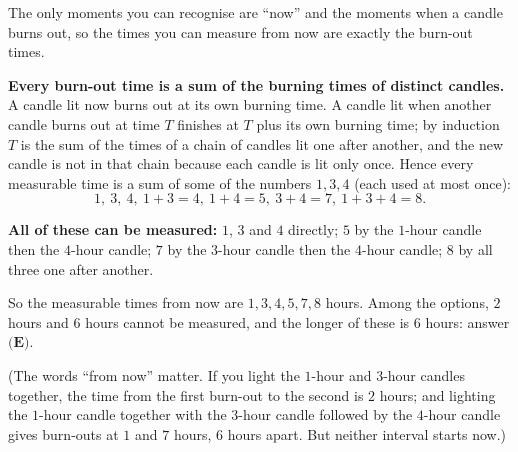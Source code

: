 The only moments you can recognise are ``now'' and the moments when a candle burns out, so the times you can measure from now are exactly the burn-out times.

\textbf{Every burn-out time is a sum of the burning times of distinct candles.} A candle lit now burns out at its own burning time. A candle lit when another candle burns out at time $T$ finishes at $T$ plus its own burning time; by induction $T$ is the sum of the times of a chain of candles lit one after another, and the new candle is not in that chain because each candle is lit only once. Hence every measurable time is a sum of some of the numbers $1,3,4$ (each used at most once):
\[1,\ 3,\ 4,\ 1+3=4,\ 1+4=5,\ 3+4=7,\ 1+3+4=8 .\]

\textbf{All of these can be measured:} $1$, $3$ and $4$ directly; $5$ by the $1$-hour candle then the $4$-hour candle; $7$ by the $3$-hour candle then the $4$-hour candle; $8$ by all three one after another.

So the measurable times from now are $1,3,4,5,7,8$ hours. Among the options, $2$ hours and $6$ hours cannot be measured, and the longer of these is $6$ hours: answer $\boxed{\textbf{(E)}}$.

(The words ``from now'' matter. If you light the $1$-hour and $3$-hour candles together, the time from the first burn-out to the second is $2$ hours; and lighting the $1$-hour candle together with the $3$-hour candle followed by the $4$-hour candle gives burn-outs at $1$ and $7$ hours, $6$ hours apart. But neither interval starts now.)
